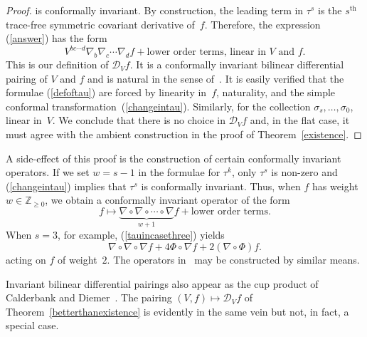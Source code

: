 \documentclass[a4paper,12pt]{amsart}
\begin{document}
\begin{proof}
is conformally invariant. By construction, the leading term in $\tau^s$ is
the $s^{\mathrm{th}}$ trace-free symmetric covariant derivative of~$f$.
Therefore, the expression (\ref{answer}) has the form
$$V^{bc\cdots d}\nabla_b\nabla_c\cdots\nabla_df+\mbox{lower order terms, linear
in $V$ and $f$}.$$
This is our definition of ${\mathcal D}_Vf$. It is a conformally invariant
bilinear differential pairing of $V$ and $f$ and is natural in the sense
of~\cite{kms}. It is easily verified that the formulae (\ref{defoftau})
are forced by linearity in~$f$, naturality, and the simple conformal
transformation~(\ref{changeintau}). Similarly, for the collection
$\sigma_s,\ldots,\sigma_0$, linear in~$V$. We conclude that there is no choice
in ${\mathcal D}_Vf$ and, in the flat case, it must agree with the ambient
construction in the proof of Theorem~\ref{existence}.
\end{proof}\renewcommand{\proofname}{Proof}

A side-effect of this proof is the construction of certain
conformally invariant operators. If we set $w=s-1$ in the formulae for
$\tau^k$, only $\tau^s$ is non-zero and (\ref{changeintau}) implies that
$\tau^s$ is conformally invariant. Thus, when $f$ has weight
$w\in{\mathbb Z}_{\geq 0}$, we obtain a conformally invariant operator of the
form
$$f\mapsto\underbrace{\nabla\circ\nabla\circ\cdots\circ\nabla}_{w+1}f
  +\mbox{lower order terms}.$$
When $s=3$, for example, (\ref{tauincasethree}) yields
$$\nabla\circ\nabla\circ\nabla f+4\Phi\circ\nabla f+2(\nabla\circ\Phi)f.$$
acting on $f$ of weight~$2$. The operators in~\cite{dnw} may be constructed by
similar means.

Invariant bilinear differential pairings also appear as the cup product of
Calderbank and Diemer~\cite{cd}. The pairing $(V,f)\mapsto{\mathcal D}_Vf$
of Theorem~\ref{betterthanexistence} is evidently in the same vein but not, in
fact, a special case.
\end{document}
